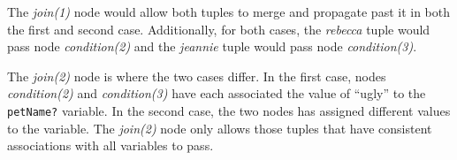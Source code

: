The \emph{join(1)} node would allow both tuples to merge and
propagate past it in both the first and second case.  Additionally,
for both cases, the \emph{rebecca} tuple would pass node
\emph{condition(2)}
and the \emph{jeannie} tuple would pass node \emph{condition(3)}.

The \emph{join(2)} node is where the two cases differ.  In the first
case, nodes \emph{condition(2)} and \emph{condition(3)} have each associated the value
of ``ugly'' to the \verb|petName?| variable.  In the second case, the
two nodes has assigned different values to the variable.  The
\emph{join(2)} node only allows those tuples that have consistent
associations with all variables to pass.

